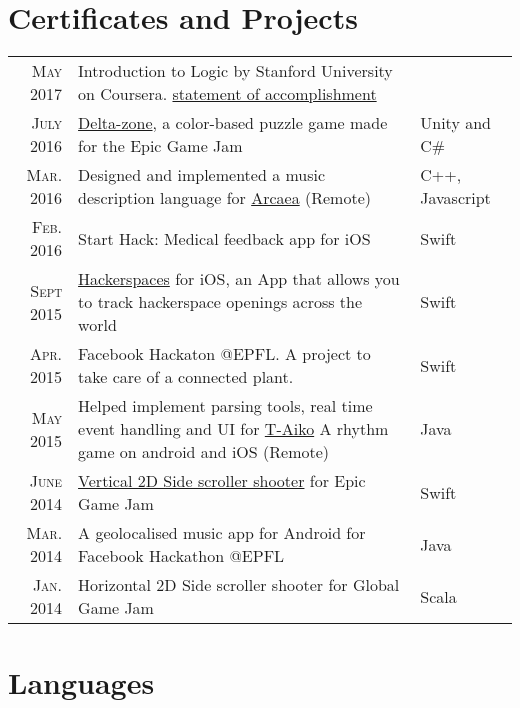 \documentclass[a4paper,10pt]{article} %
\begin{document}
\section{Certificates and Projects}
\renewcommand{\arraystretch}{1.5}
\begin{tabular}{rp{10cm}|l}
\textsc{May} 2017 & Introduction to Logic by Stanford University on Coursera. \footnotesize{\href{https://www.coursera.org/account/accomplishments/certificate/RPGEPLA94HFF}{statement of accomplishment}}\\

\textsc{July} 2016 & \href{http://epicgamejam.com/game/delta-zone}{Delta-zone}, a color-based puzzle game made for the Epic Game Jam & Unity and C\#\\
\textsc{Mar.} 2016 & Designed and implemented a music description language for \href{https://arcaea.lowiro.com}{Arcaea} (Remote) & C++, Javascript\\
\textsc{Feb.} 2016 & Start Hack: Medical feedback app for iOS & Swift\\
\textsc{Sept} 2015 & \href{https://itunes.apple.com/us/app/hackerspaces/id1035583993?ls=1&mt=8}{Hackerspaces} for iOS, an App that allows you to track hackerspace openings across the world & Swift\\
\textsc{Apr.} 2015 & Facebook Hackaton @EPFL. A project to take care of a connected plant. & Swift\\
\textsc{May} 2015 & Helped implement parsing tools, real time event handling and UI for \href{https://play.google.com/store/apps/details?id=guy.taiko}{T-Aiko} A rhythm game on android and iOS (Remote) & Java\\
\textsc{June} 2014 & \href{http://epicgamejam.com/game/the-sole-saviour}{Vertical 2D Side scroller shooter} for Epic Game Jam & Swift\\
\textsc{Mar.} 2014 & A geolocalised music app for Android for Facebook Hackathon @EPFL & Java\\
\textsc{Jan.} 2014 & Horizontal 2D Side scroller shooter for Global Game Jam & Scala\\
\end{tabular}
\renewcommand{\arraystretch}{1.2}


\section{Languages}
\end{document}
